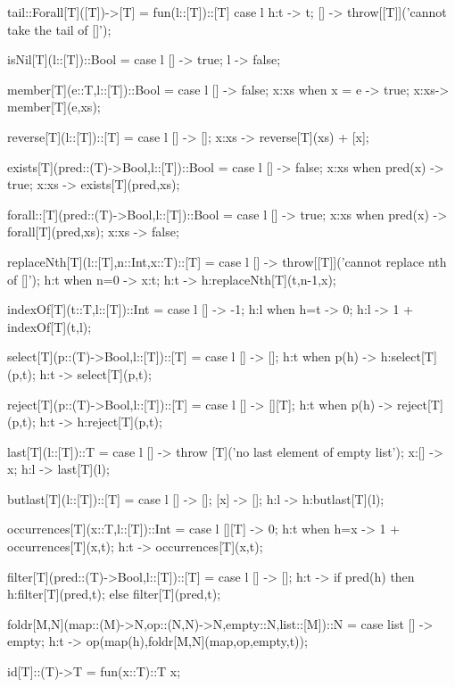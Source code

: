\documentclass[5p,times]{elsarticle}
\begin{document}
\begin{FigESL}
tail::Forall[T]([T])->[T] = fun(l::[T])::[T]
  case l {
    h:t -> t;
    [] -> throw[[T]]('cannot take the tail of []');
  }
  
isNil[T](l::[T])::Bool =
  case l {
    [] -> true;
    l -> false;
  }
  
member[T](e::T,l::[T])::Bool =
  case l {
    [] -> false;
    x:xs when x = e -> true;
    x:xs-> member[T](e,xs);
  }
  
reverse[T](l::[T])::[T] =
  case l {
    [] -> [];
    x:xs -> reverse[T](xs) + [x];
  }

exists[T](pred::(T)->Bool,l::[T])::Bool =
  case l {
    [] -> false;
    x:xs when pred(x) -> true;
    x:xs -> exists[T](pred,xs);
  }

forall::[T](pred::(T)->Bool,l::[T])::Bool =
  case l {
    [] -> true;
    x:xs when pred(x) -> forall[T](pred,xs);
    x:xs -> false;
  }
  
replaceNth[T](l::[T],n::Int,x::T)::[T] = 
  case l {
    [] -> throw[[T]]('cannot replace nth of []');
    h:t when n=0 -> x:t;
    h:t -> h:replaceNth[T](t,n-1,x);
  }

indexOf[T](t::T,l::[T])::Int =
  case l {
    [] -> -1;
    h:l when h=t -> 0;
    h:l -> 1 + indexOf[T](t,l);
  }
  
select[T](p::(T)->Bool,l::[T])::[T] =
  case l {
    [] -> [];
    h:t when p(h) -> h:select[T](p,t);
    h:t -> select[T](p,t);
  }
  
reject[T](p::(T)->Bool,l::[T])::[T] =
  case l {
    [] -> [][T];
    h:t when p(h) -> reject[T](p,t);
    h:t -> h:reject[T](p,t);
  }
  
last[T](l::[T])::T =
  case l {
    [] -> throw [T]('no last element of empty list');
    x:[] -> x;
    h:l -> last[T](l);
  }
  
butlast[T](l::[T])::[T] =
  case l {
    [] -> [];
    [x] -> [];
    h:l -> h:butlast[T](l);
  }

occurrences[T](x::T,l::[T])::Int =
  case l {
    [][T] -> 0;
    h:t when h=x -> 1 + occurrences[T](x,t);
    h:t -> occurrences[T](x,t);
  }
  
filter[T](pred::(T)->Bool,l::[T])::[T] = 
  case l {
    [] -> [];
    h:t ->
      if pred(h) 
      then h:filter[T](pred,t);
      else filter[T](pred,t);
  }
  
foldr[M,N](map::(M)->N,op::(N,N)->N,empty::N,list::[M])::N =
  case list {
    [] -> empty;
    h:t -> op(map(h),foldr[M,N](map,op,empty,t));
  }
  
id[T]::(T)->T = fun(x::T)::T x;
  

\end{FigESL}
\end{document}
